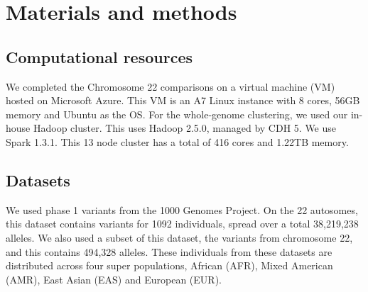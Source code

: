 \documentclass{bmcart}
\begin{document}
\section*{Materials and methods}
\subsection*{Computational resources}
We completed the Chromosome 22 comparisons on a virtual machine (VM) hosted on Microsoft Azure. This VM is an A7 Linux instance with 8 cores, 56GB memory and Ubuntu as the OS. 
For the whole-genome clustering, we used our in-house Hadoop cluster. This uses Hadoop 2.5.0, managed by CDH 5. We use Spark 1.3.1. This 13 node cluster has a total of 416 cores and 1.22TB memory.


\subsection*{Datasets}
We used  phase 1 variants from the 1000 Genomes Project. On the 22 autosomes, this dataset contains variants for 1092 individuals, spread over a total 38,219,238 alleles.
We also used a subset of this dataset, the variants from chromosome 22, and this contains 494,328 alleles.
These individuals from these datasets are distributed across four super populations, African (AFR), Mixed American (AMR), East Asian (EAS) and European (EUR).
\end{document}

